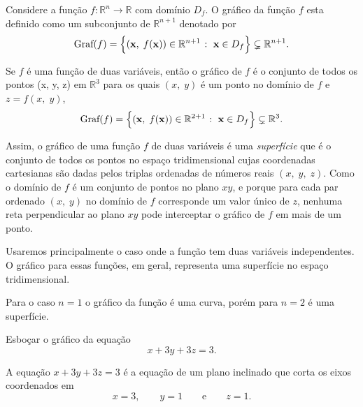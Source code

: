 \begin{defi}\label{new02}
	Considere a função $f\colon \mathbb{R}^n\to \mathbb{R}$ com domínio $D_f$. O gráfico da função $f$ esta definido como um subconjunto de
	$\mathbb{R}^{n+1}$ denotado por
	\begin{equation*}
		\textrm{Graf}(f)=\Bigl\{(\mathbf{x},\; f(\mathbf{x}))\in \mathbb{R}^{n+1}\; \colon\;  \mathbf{x}\in D_f \Bigr\} \subsetneq \mathbb{R}^{n+1}.
	\end{equation*}
\end{defi}

Se \(f\) é uma função de duas variáveis, então o gráfico de \(f\) é o conjunto de todos os pontos (x,\; y,\; z) em \(\mathbb{R}^{3}\) para os quais \((x,\; y)\) é um ponto no domínio de \(f\) e \(z=f(x,\; y)\),
\begin{equation*}
	\textrm{Graf}(f)=\Bigl\{(\mathbf{x},\; f(\mathbf{x}))\in \mathbb{R}^{2+1}\; \colon\;  \mathbf{x}\in D_f \Bigr\} \subsetneq \mathbb{R}^{3}.
\end{equation*}

Assim, o gráfico de uma função \(f\) de duas variáveis é uma \textit{superfície} que é o conjunto de todos os pontos no espaço tridimensional cujas 
coordenadas cartesianas são dadas pelos triplas ordenadas de números reais \((x,\; y,\; z)\). Como o domínio de \(f\) é um conjunto de pontos no plano 
\(xy\), e porque para cada par ordenado \((x,\; y)\) no domínio de \(f\) corresponde um valor único de \(z\), nenhuma reta perpendicular ao plano \(xy\) 
pode interceptar o gráfico de \(f\) em mais de um ponto.

Usaremos principalmente o caso onde a função tem duas variáveis independentes. O gráfico para essas funções, em geral, representa uma superfície no espaço tridimensional.

\begin{rema}
	Para o caso $n=1$ o gráfico da função é uma curva, porém para $n=2$ é uma superfície.
\end{rema}

\begin{exer}
	Esboçar o gráfico da equação 
	\begin{equation*}
		x+3y+3z = 3.
	\end{equation*}
\end{exer}

\solo
A equação \(x + 3y + 3z = 3\) é a equação de um plano inclinado que corta os eixos coordenados em 
\begin{equation*}
	x = 3, \qquad y =1 \qquad \text{e}\qquad z =1.
\end{equation*}

